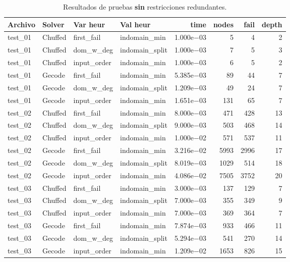\begin{compactfloats}
\begin{table}[H]
  \centering
  \small
  \setlength{\tabcolsep}{1.8pt}
  \caption{Resultados de pruebas \textbf{sin} restricciones redundantes.}
  \label{tab:pruebas-sudoku-off}
  \begin{tabular}{l l l l r r r r}
    \toprule
    \textbf{Archivo} & \textbf{Solver} & \textbf{Var heur} & \textbf{Val heur} & \textbf{time} & \textbf{nodes} & \textbf{fail} & \textbf{depth} \\
    \midrule
    test\_01 & Chuffed & first\_fail  & indomain\_min   & 1.000e$-$03 & 5    & 4    & 2 \\
    test\_01 & Chuffed & dom\_w\_deg  & indomain\_split & 1.000e$-$03 & 7    & 5    & 3 \\
    test\_01 & Chuffed & input\_order & indomain\_min   & 1.000e$-$03 & 6    & 5    & 2 \\
    test\_01 & Gecode  & first\_fail  & indomain\_min   & 5.385e$-$03 & 89   & 44   & 7 \\
    test\_01 & Gecode  & dom\_w\_deg  & indomain\_split & 1.209e$-$03 & 49   & 24   & 7 \\
    test\_01 & Gecode  & input\_order & indomain\_min   & 1.651e$-$03 & 131  & 65   & 7 \\
    \midrule
    test\_02 & Chuffed & first\_fail  & indomain\_min   & 8.000e$-$03 & 471  & 428  & 13 \\
    test\_02 & Chuffed & dom\_w\_deg  & indomain\_split & 9.000e$-$03 & 503  & 468  & 14 \\
    test\_02 & Chuffed & input\_order & indomain\_min   & 1.000e$-$02 & 571  & 537  & 11 \\
    test\_02 & Gecode  & first\_fail  & indomain\_min   & 3.216e$-$02 & 5993 & 2996 & 17 \\
    test\_02 & Gecode  & dom\_w\_deg  & indomain\_split & 8.019e$-$03 & 1029 & 514  & 18 \\
    test\_02 & Gecode  & input\_order & indomain\_min   & 4.086e$-$02 & 7505 & 3752 & 20 \\
    \midrule
    test\_03 & Chuffed & first\_fail  & indomain\_min   & 3.000e$-$03 & 137  & 129  & 7 \\
    test\_03 & Chuffed & dom\_w\_deg  & indomain\_split & 7.000e$-$03 & 355  & 349  & 9 \\
    test\_03 & Chuffed & input\_order & indomain\_min   & 7.000e$-$03 & 369  & 364  & 7 \\
    test\_03 & Gecode  & first\_fail  & indomain\_min   & 7.874e$-$03 & 933  & 466  & 11 \\
    test\_03 & Gecode  & dom\_w\_deg  & indomain\_split & 5.294e$-$03 & 541  & 270  & 14 \\
    test\_03 & Gecode  & input\_order & indomain\_min   & 1.209e$-$02 & 1653 & 826  & 15 \\
    \bottomrule
  \end{tabular}
\end{table}
\end{compactfloats}

\FloatBarrier
